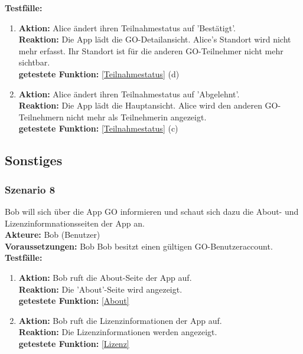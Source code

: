 \documentclass[parskip=full]{scrartcl}
\def\threedigits#1{%
  \ifnum#1<100 0\fi
  \ifnum#1<10 0\fi
  \number#1}
\begin{document}
\textbf{Testfälle:}
\begin{enumerate}[label={\textbf{/T\protect\threedigits{\theenumi}0/}}, leftmargin=*, resume]
	\item \textbf{Aktion:} Alice ändert ihren Teilnahmestatus auf 'Bestätigt'.\\
	\textbf{Reaktion:} Die App lädt die GO-Detailansicht. Alice's Standort wird nicht mehr erfasst. Ihr Standort ist für die anderen GO-Teilnehmer nicht mehr sichtbar.\\
	\textbf{getestete Funktion:} \ref{Teilnahmestatus} (d)
	\item \textbf{Aktion:} Alice ändert ihren Teilnahmestatus auf 'Abgelehnt'.\\
	\textbf{Reaktion:} Die App lädt die Hauptansicht. Alice wird den anderen GO-Teilnehmern nicht mehr als Teilnehmerin angezeigt.\\
	\textbf{getestete Funktion:} \ref{Teilnahmestatus} (c)
\end{enumerate}

\subsection{Sonstiges}

\subsubsection*{Szenario 8} Bob will sich über die App GO informieren und schaut sich dazu die About- und Lizenzinformnationsseiten der App an.\\

\textbf{Akteure: }Bob (Benutzer)\\

\textbf{Voraussetzungen: }Bob Bob besitzt einen gültigen GO-Benutzeraccount.\\

\textbf{Testfälle:}
\begin{enumerate}[label={\textbf{/T\protect\threedigits{\theenumi}0/}}, leftmargin=*, resume]
	\item \textbf{Aktion:} Bob ruft die About-Seite der App auf.\\
	\textbf{Reaktion:} Die 'About'-Seite wird angezeigt.\\
	\textbf{getestete Funktion:} \ref{About}
	\item \textbf{Aktion:} Bob ruft die Lizenzinformationen der App auf.\\
	\textbf{Reaktion: }Die Lizenzinformationen werden angezeigt.\\
	\textbf{getestete Funktion:} \ref{Lizenz}
\end{enumerate}
\end{document}
